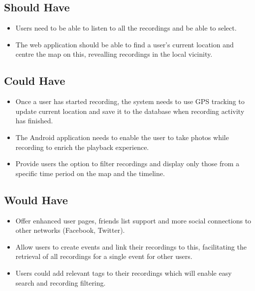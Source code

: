 \documentclass{l3proj}
\begin{document}
\subsection{Should Have}

	\begin{itemize}

	\item {} Users need to be able to listen to all the recordings and be able to select.

	\item {} The web application should be able to find a user's current location and centre the map on this, revealling recordings in the local vicinity.

	\end{itemize}

\subsection{Could Have}


	\begin{itemize}

	\item {} Once a user has started recording, the system needs to use GPS tracking to update current location and save it to the database when recording activity has finished.

	\item {} The Android application needs to enable the user to take photos while recording to enrich the playback experience.

	\item {} Provide users the option to filter recordings and display only those from a specific time period on the map and the timeline.

	\end{itemize}


\subsection{Would Have}


	\begin{itemize}

	\item {} Offer enhanced user pages, friends list support and more social connections to other networks (Facebook, Twitter).

	\item {} Allow users to create events and link their recordings to this, facilitating the retrieval of all recordings for a single event for other users.

	\item {} Users could add relevant tags to their recordings which will enable easy search and recording filtering.

	\end{itemize}
\end{document}
